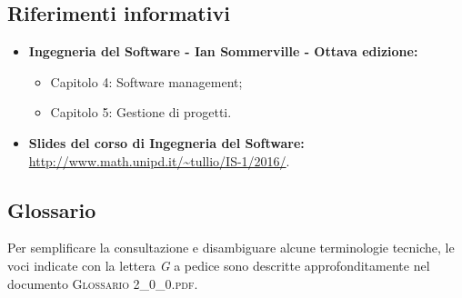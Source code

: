 \subsection{Riferimenti informativi}
\begin{itemize}
\item \textbf{Ingegneria del Software - Ian Sommerville - Ottava edizione:}
	\begin{itemize}
		\item Capitolo 4: Software management;
		\item Capitolo 5: Gestione di progetti.
	\end{itemize}
\item \textbf{Slides del corso di Ingegneria del Software:}\\
\url{http://www.math.unipd.it/~tullio/IS-1/2016/}.
\end{itemize}

\subsection{Glossario}
Per semplificare la consultazione e disambiguare alcune terminologie tecniche, le voci indicate con la lettera \textit{G} a pedice sono descritte approfonditamente nel documento \textsc{Glossario 2\_0\_0.pdf}.